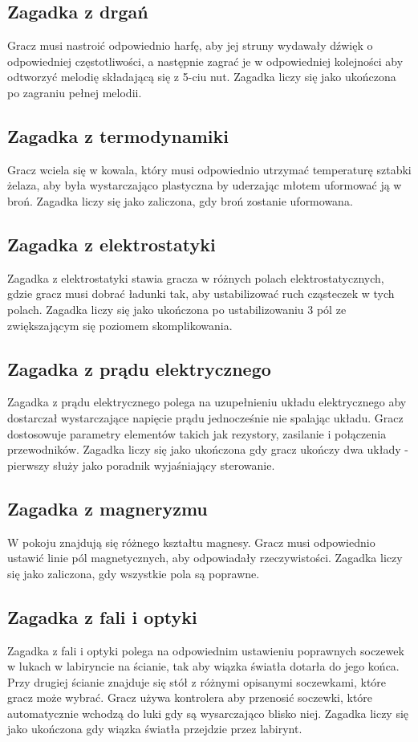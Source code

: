 \subsection{Zagadka z drgań}
Gracz musi nastroić odpowiednio harfę, aby jej struny wydawały dźwięk o odpowiedniej częstotliwości, a następnie zagrać je w odpowiedniej kolejności aby odtworzyć melodię składającą się z 5-ciu nut. Zagadka liczy się jako ukończona po zagraniu pełnej melodii.

\subsection{Zagadka z termodynamiki}
Gracz wciela się w kowala, który musi odpowiednio utrzymać temperaturę sztabki żelaza, aby była wystarczająco plastyczna by uderzając młotem uformować ją w broń. Zagadka liczy się jako zaliczona, gdy broń zostanie uformowana.

\subsection{Zagadka z elektrostatyki}
Zagadka z elektrostatyki stawia gracza w różnych polach elektrostatycznych, gdzie gracz musi dobrać ładunki tak, aby ustabilizować ruch cząsteczek w tych polach. Zagadka liczy się jako ukończona po ustabilizowaniu 3 pól ze zwiększającym się poziomem skomplikowania.

\subsection{Zagadka z prądu elektrycznego}
Zagadka z prądu elektrycznego polega na uzupełnieniu układu elektrycznego aby dostarczał wystarczające napięcie prądu jednocześnie nie spalając układu. Gracz dostosowuje parametry elementów takich jak rezystory, zasilanie i połączenia przewodników. Zagadka liczy się jako ukończona gdy gracz ukończy dwa układy - pierwszy służy jako poradnik wyjaśniający sterowanie.

\subsection{Zagadka z magneryzmu}
W pokoju znajdują się różnego kształtu magnesy. Gracz musi odpowiednio ustawić linie pól magnetycznych, aby odpowiadały rzeczywistości. Zagadka liczy się jako zaliczona, gdy wszystkie pola są poprawne.

\subsection{Zagadka z fali i optyki}
Zagadka z fali i optyki polega na odpowiednim ustawieniu poprawnych soczewek w lukach w labiryncie na ścianie, tak aby wiązka światła dotarła do jego końca. Przy drugiej ścianie znajduje się stół z różnymi opisanymi soczewkami, które gracz może wybrać. Gracz używa kontrolera aby przenosić soczewki, które automatycznie wchodzą do luki gdy są wysarczająco blisko niej. Zagadka liczy się jako ukończona gdy wiązka światła przejdzie przez labirynt.

